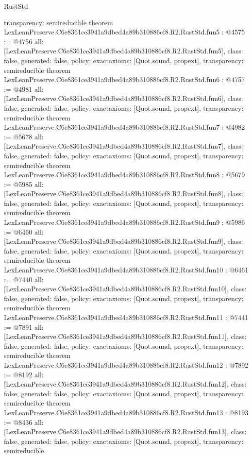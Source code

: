 \begin{lexlean}{RustStd}
\begin{coremodule}
{  transparency: semireducible
}
theorem LexLeanPreserve.C6e8361ce3941a9dbed4a89b310886cf8.R2.RustStd.fun5 : @4575 := @4756 {
  all: [LexLeanPreserve.C6e8361ce3941a9dbed4a89b310886cf8.R2.RustStd.fun5],
  class: false,
  generated: false,
  policy: exact{axioms: [Quot.sound, propext]},
  transparency: semireducible
}
theorem LexLeanPreserve.C6e8361ce3941a9dbed4a89b310886cf8.R2.RustStd.fun6 : @4757 := @4981 {
  all: [LexLeanPreserve.C6e8361ce3941a9dbed4a89b310886cf8.R2.RustStd.fun6],
  class: false,
  generated: false,
  policy: exact{axioms: [Quot.sound, propext]},
  transparency: semireducible
}
theorem LexLeanPreserve.C6e8361ce3941a9dbed4a89b310886cf8.R2.RustStd.fun7 : @4982 := @5678 {
  all: [LexLeanPreserve.C6e8361ce3941a9dbed4a89b310886cf8.R2.RustStd.fun7],
  class: false,
  generated: false,
  policy: exact{axioms: [Quot.sound, propext]},
  transparency: semireducible
}
theorem LexLeanPreserve.C6e8361ce3941a9dbed4a89b310886cf8.R2.RustStd.fun8 : @5679 := @5985 {
  all: [LexLeanPreserve.C6e8361ce3941a9dbed4a89b310886cf8.R2.RustStd.fun8],
  class: false,
  generated: false,
  policy: exact{axioms: [Quot.sound, propext]},
  transparency: semireducible
}
theorem LexLeanPreserve.C6e8361ce3941a9dbed4a89b310886cf8.R2.RustStd.fun9 : @5986 := @6460 {
  all: [LexLeanPreserve.C6e8361ce3941a9dbed4a89b310886cf8.R2.RustStd.fun9],
  class: false,
  generated: false,
  policy: exact{axioms: [Quot.sound, propext]},
  transparency: semireducible
}
theorem LexLeanPreserve.C6e8361ce3941a9dbed4a89b310886cf8.R2.RustStd.fun10 : @6461 := @7440 {
  all: [LexLeanPreserve.C6e8361ce3941a9dbed4a89b310886cf8.R2.RustStd.fun10],
  class: false,
  generated: false,
  policy: exact{axioms: [Quot.sound, propext]},
  transparency: semireducible
}
theorem LexLeanPreserve.C6e8361ce3941a9dbed4a89b310886cf8.R2.RustStd.fun11 : @7441 := @7891 {
  all: [LexLeanPreserve.C6e8361ce3941a9dbed4a89b310886cf8.R2.RustStd.fun11],
  class: false,
  generated: false,
  policy: exact{axioms: [Quot.sound, propext]},
  transparency: semireducible
}
theorem LexLeanPreserve.C6e8361ce3941a9dbed4a89b310886cf8.R2.RustStd.fun12 : @7892 := @8192 {
  all: [LexLeanPreserve.C6e8361ce3941a9dbed4a89b310886cf8.R2.RustStd.fun12],
  class: false,
  generated: false,
  policy: exact{axioms: [Quot.sound, propext]},
  transparency: semireducible
}
theorem LexLeanPreserve.C6e8361ce3941a9dbed4a89b310886cf8.R2.RustStd.fun13 : @8193 := @8436 {
  all: [LexLeanPreserve.C6e8361ce3941a9dbed4a89b310886cf8.R2.RustStd.fun13],
  class: false,
  generated: false,
  policy: exact{axioms: [Quot.sound, propext]},
  transparency: semireducible
}
\end{coremodule}
\end{lexlean}
